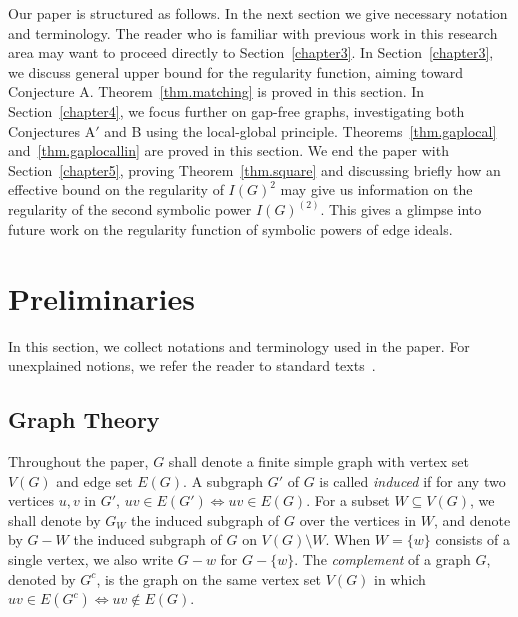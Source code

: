 \documentclass[ALCO,ThmDefs,Unicode,epreuves]{cedram}
\begin{document}
Our paper is structured as follows. In the next section we give necessary notation and terminology. The reader who is familiar with previous work in this research area may want to proceed directly to Section~\ref{chapter3}. In Section~\ref{chapter3}, we discuss general upper bound for the regularity function, aiming toward Conjecture A. Theorem~\ref{thm.matching} is proved in this section. In Section~\ref{chapter4}, we focus further on gap-free graphs, investigating both Conjectures $\text{A}'$ and B using the local-global principle. Theorems~\ref{thm.gaplocal} and~\ref{thm.gaplocallin} are proved in this section. We end the paper with Section~\ref{chapter5}, proving Theorem~\ref{thm.square} and discussing briefly how an effective bound on the regularity of $I(G)^2$ may give us information on the regularity of the second symbolic power $I(G)^{(2)}$. This gives a glimpse into future work on the regularity function of symbolic powers of edge ideals.

\endgroup

\section{Preliminaries}\label{chapter2}

In this section, we collect notations and terminology used in the paper. For unexplained notions, we refer the reader to standard texts~\cite{BrHe, E, Harary, HH, MS, Stanley, V}.

\subsection{Graph Theory} 
Throughout the paper, $G$ shall denote a finite simple graph with vertex set $V(G)$ and edge set $E(G)$. A subgraph $G'$ of $G$ is called \emph{induced} if for any two vertices $u,v$ in $G'$, $uv \in E(G') \Leftrightarrow uv \in E(G)$. For a subset $W \subseteq V(G)$, we shall denote by $G_W$ the induced subgraph of $G$ over the vertices in $W$, and denote by $G-W$ the induced subgraph of $G$ on $V(G) \setminus W$. When $W = \{w\}$ consists of a single vertex, we also write $G-w$ for $G-\{w\}$. The \emph{complement} of a graph $G$, denoted by $G^c$, is the graph on the same vertex set $V(G)$ in which $uv \in E(G^c) \Leftrightarrow uv \not\in E(G)$.
\end{document}
